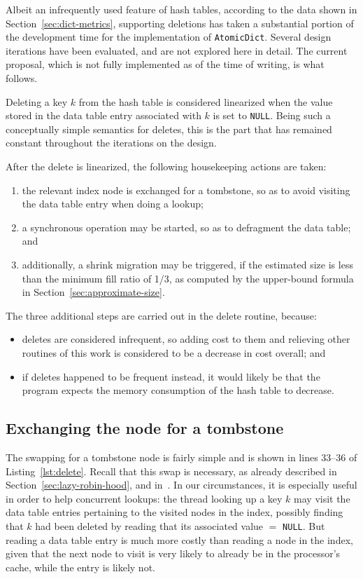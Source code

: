 Albeit an infrequently used feature of hash tables, according to the data shown in Section~\ref{sec:dict-metrics}, supporting deletions has taken a substantial portion of the development time for the implementation of \texttt{AtomicDict}.
Several design iterations have been evaluated, and are not explored here in detail.
The current proposal, which is not fully implemented as of the time of writing, is what follows.

Deleting a key $k$ from the hash table is considered linearized when the value stored in the data table entry associated with $k$ is set to \texttt{NULL}.
Being such a conceptually simple semantics for deletes, this is the part that has remained constant throughout the iterations on the design.

After the delete is linearized, the following housekeeping actions are taken:
\begin{enumerate}
    \item the relevant index node is exchanged for a tombstone, so as to avoid visiting the data table entry when doing a lookup;
    \item a synchronous operation may be started, so as to defragment the data table; and
    \item additionally, a shrink migration may be triggered, if the estimated size is less than the minimum fill ratio of 1/3, as computed by the upper-bound formula in Section~\ref{sec:approximate-size}.
\end{enumerate}

The three additional steps are carried out in the delete routine, because:
\begin{itemize}
    \item deletes are considered infrequent, so adding cost to them and relieving other routines of this work is considered to be a decrease in cost overall; and
    \item if deletes happened to be frequent instead, it would likely be that the program expects the memory consumption of the hash table to decrease.
\end{itemize}

\subsection{Exchanging the node for a tombstone}\label{subsec:exchanging-node-tombstone}

The swapping for a tombstone node is fairly simple and is shown in lines 33--36 of Listing~\ref{lst:delete}.
Recall that this swap is necessary, as already described in Section~\ref{sec:lazy-robin-hood}, and in~\cite[\S6.4]{the-art-vol-2}.
In our circumstances, it is especially useful in order to help concurrent lookups: the thread looking up a key $k$ may visit the data table entries pertaining to the visited nodes in the index, possibly finding that $k$ had been deleted by reading that its associated value $=$ \texttt{NULL}.
But reading a data table entry is much more costly than reading a node in the index, given that the next node to visit is very likely to already be in the processor's cache, while the entry is likely not.

